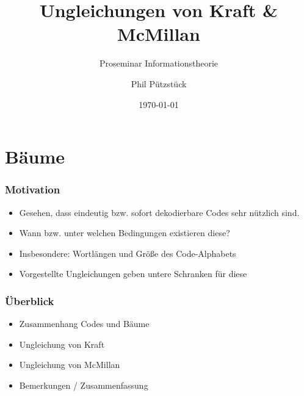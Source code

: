 \documentclass{beamer}
\title{Ungleichungen von Kraft \& McMillan}
\subtitle{Proseminar Informationstheorie}
\author{Phil Pützstück}
\date{\today}
\begin{document}
\maketitle

\section{Bäume}
\begin{frame}
    \frametitle{Motivation}
    \begin{itemize}
        \setlength\itemsep{2em}
        \item Gesehen, dass eindeutig bzw. sofort dekodierbare Codes sehr nützlich sind.
        \item Wann bzw. unter welchen Bedingungen existieren diese?
        \item Insbesondere: Wortlängen und Größe des Code-Alphabets
        \item Vorgestellte Ungleichungen geben untere Schranken für diese
    \end{itemize}
\end{frame}

\begin{frame}
    \frametitle{Überblick}
    \begin{itemize}
        \setlength\itemsep{2em}
        \item Zusammenhang Codes und Bäume
        \item Ungleichung von Kraft
        \item Ungleichung von McMillan
        \item Bemerkungen / Zusammenfassung
    \end{itemize}
\end{frame}
\end{document}

